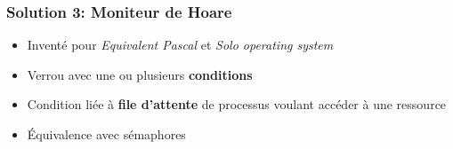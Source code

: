 \documentclass{beamer}
\begin{document}
\begin{frame}
  \frametitle{Solution 3: Moniteur de Hoare}
  \begin{minipage}{.49\textwidth}
    \begin{itemize}
    \item Inventé pour \textit{Equivalent Pascal} et \textit{Solo operating
        system}
    \item Verrou avec une ou plusieurs \textbf{conditions}
    \item Condition liée à \textbf{file d'attente} de processus voulant
      accéder à une ressource
    \item Équivalence avec sémaphores
    \end{itemize}
  \end{minipage}
  \begin{minipage}{.49\textwidth}
    \begin{center}
    \end{center}
  \end{minipage}
\end{frame} %
\end{document}
